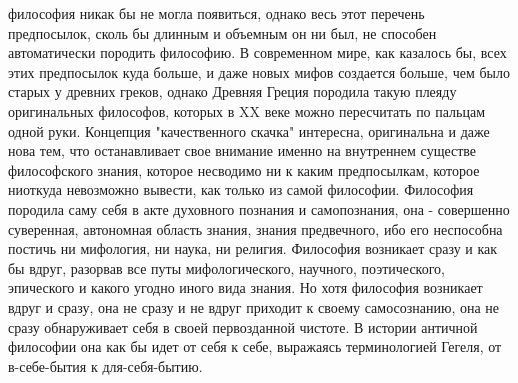 \documentclass[12pt]{article}
\begin{document}
философия  никак  бы  не  могла  появиться,  однако  весь  этот  перечень  предпосылок,  сколь  бы  длинным  и
объемным он ни был, не способен автоматически породить философию. В современном мире, как казалось бы,
всех этих предпосылок куда больше, и даже новых мифов создается больше, чем было старых у древних греков,
однако  Древняя  Греция  породила  такую  плеяду  оригинальных  философов,  которых  в  XX  веке  можно
пересчитать по пальцам одной руки. 
Концепция "качественного скачка" интересна, оригинальна и даже нова тем, что останавливает свое внимание
именно на внутреннем существе философского знания, которое несводимо ни к каким предпосылкам, которое
ниоткуда  невозможно  вывести,  как  только  из  самой  философии.  Философия  породила  саму  себя  в  акте
духовного  познания  и  самопознания,  она  -  совершенно  суверенная,  автономная  область  знания,  знания
предвечного, ибо его неспособна постичь ни мифология, ни наука, ни религия. Философия возникает сразу и
как бы вдруг, разорвав все путы мифологического, научного, поэтического, эпического и какого угодно иного
вида  знания.  Но  хотя  философия  возникает  вдруг  и  сразу,  она  не  сразу  и  не  вдруг  приходит  к  своему
самосознанию, она не сразу обнаруживает себя в своей первозданной чистоте. В истории античной философии
она как бы идет от себя к себе, выражаясь терминологией Гегеля, от в-себе-бытия к для-себя-бытию.

\newpage
\end{document}
